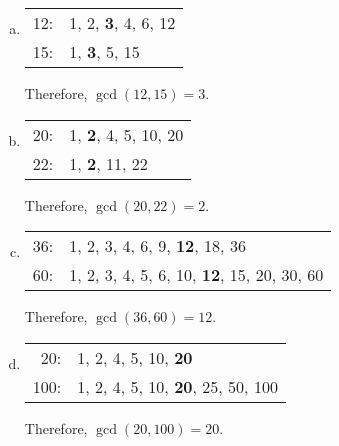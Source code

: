 \documentclass[11pt,letterpaper]{article}
\begin{document}
\sol
\begin{enumerate}[(a)]
\item \phantom{.}\par
	\begin{table}[!ht]
	\centering
	\begin{tabular}{rl}
	12: & 1, 2, \textbf{3}, 4, 6, 12 \\
	15: & 1, \textbf{3}, 5, 15
	\end{tabular}
	\end{table} \par
Therefore, $\gcd(12, 15)= 3$. \pspace

\item \phantom{.}\par
	\begin{table}[!ht]
	\centering
	\begin{tabular}{rl}
	20: & 1, \textbf{2}, 4, 5, 10, 20 \\
	22: & 1, \textbf{2}, 11, 22
	\end{tabular}
	\end{table} \par
Therefore, $\gcd(20, 22)= 2$. \pspace

\item \phantom{.}\par
	\begin{table}[!ht]
	\centering
	\begin{tabular}{rl}
	36: & 1, 2, 3, 4, 6, 9, \textbf{12}, 18, 36 \\
	60: & 1, 2, 3, 4, 5, 6, 10, \textbf{12}, 15, 20, 30, 60 
	\end{tabular}
	\end{table} \par
 Therefore, $\gcd(36, 60)= 12$. \pspace
 
\item \phantom{.}\par
	\begin{table}[!ht]
	\centering
	\begin{tabular}{rl}
	20: & 1, 2, 4, 5, 10, \textbf{20} \\
	100: & 1, 2, 4, 5, 10, \textbf{20}, 25, 50, 100
	\end{tabular}
	\end{table} \par 
Therefore, $\gcd(20, 100)= 20$. 
\end{enumerate}



\newpage
\end{document}
